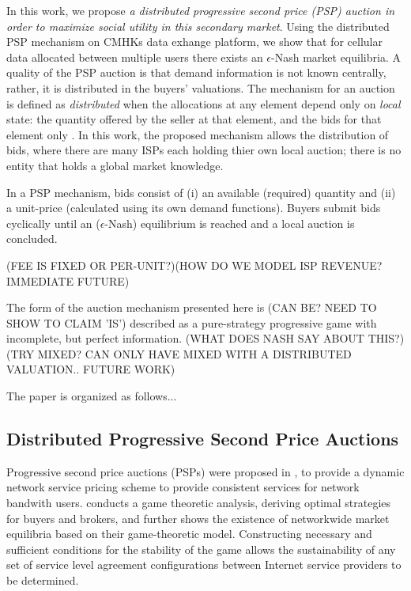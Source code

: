 \documentclass[12pt]{article}
\theoremstyle{definition}
\begin{document}
\begin{multicols}{2}
In this work, we propose \emph{a distributed progressive second price (PSP) auction in
order to maximize social utility in this secondary market}. Using the
distributed PSP mechanism on CMHKs data
exhange platform, we show that for cellular data allocated between multiple users there
exists an $\epsilon$-Nash market equilibria. A quality of the PSP auction is that
demand information is not known centrally, rather, it is distributed in the
buyers' valuations. The mechanism for an auction is defined
as \emph{distributed} when the allocations at any element depend only on
\emph{local} state: the quantity offered by the seller at that element, and the
bids for that element only \cite{lazar}. In this work, the proposed mechanism
allows the distribution of bids, where there are many ISPs each holding
thier own local auction; there is no entity that holds a global market knowledge.

In a PSP mechanism, bids consist of (i) an available (required) quantity and (ii) a unit-price (calculated
using its own demand functions). Buyers submit bids cyclically until an
($\epsilon$-Nash) equilibrium is reached and a local auction is concluded. 

(FEE IS FIXED OR
PER-UNIT?)(HOW DO WE MODEL ISP REVENUE? IMMEDIATE FUTURE)

The form of the auction mechanism presented here is (CAN BE? NEED TO SHOW TO
CLAIM 'IS') described as a
pure-strategy progressive game with incomplete, but perfect information. (WHAT
DOES NASH SAY ABOUT THIS?) (TRY MIXED? CAN ONLY HAVE MIXED WITH A DISTRIBUTED
VALUATION.. FUTURE WORK) 

The paper is organized as follows...

\subsection{Distributed Progressive Second Price Auctions}

Progressive second price auctions (PSPs) were proposed
in \cite{lazar}, \cite{diffserve} to provide a dynamic network service pricing
scheme to provide consistent services for network bandwith users.
\cite{diffserve} conducts a game theoretic analysis, deriving
optimal strategies for buyers and brokers, and further shows the existence
of networkwide market equilibria based on their game-theoretic
model. Constructing necessary and sufficient conditions for the stability
of the game allows the sustainability of any set
of service level agreement configurations between Internet service
providers to be determined.


\end{multicols}
\end{document}
